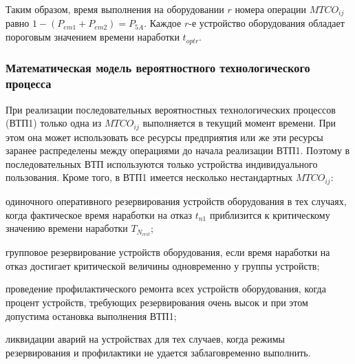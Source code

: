 Таким образом, время выполнения на оборудовании $r$ номера операции $MTCO_{ij}$ равно $1-(P_{em1}+P_{em2}) = P_{5A}$.  Каждое $r$-е устройство оборудования обладает пороговым значением времени наработки $t_{optr}$.



\subsubsection{Математическая модель вероятностного технологического процесса}

При реализации последовательных вероятностных технологических процессов (ВТП1) только одна из $MTCO_{ij}$ выполняется в текущий момент времени. При этом она может использовать все ресурсы предприятия или же эти ресурсы заранее распределены между операциями до начала реализации ВТП1. Поэтому в последовательных ВТП используются только устройства индивидуального пользования. Кроме того, в ВТП1 имеется несколько нестандартных $MTCO_{ij}$:
\begin{textitemize}
    \item одиночного оперативного резервирования устройств оборудования в тех случаях, когда фактическое время наработки на отказ $t_{n1}$ приблизится к критическому значению времени наработки $T_{N_{crit}}$;
    \item групповое резервирование устройств оборудования, если время наработки на отказ достигает критической величины одновременно у группы устройств;
    \item проведение профилактического ремонта всех устройств оборудования, когда процент устройств, требующих резервирования очень высок и при этом допустима остановка выполнения ВТП1;
    \item ликвидации аварий на устройствах для тех случаев, когда режимы резервирования и профилактики не удается заблаговременно выполнить.
\end{textitemize}



\begin{SCn}
\end{SCn}


\begin{SCn}
\end{SCn}


